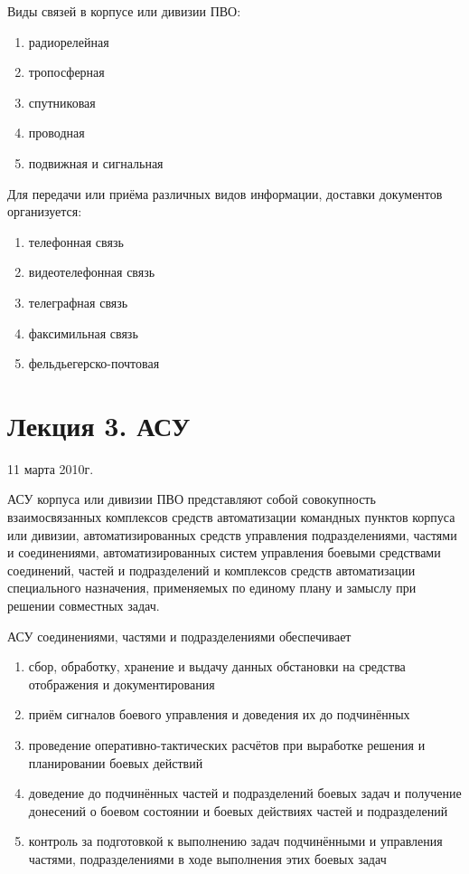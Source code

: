 \documentclass[a4paper,12pt]{article}
\begin{document}
	Виды связей в корпусе или дивизии ПВО:
	\begin{enumerate}
		\item радиорелейная
		\item тропосферная
		\item спутниковая
		\item проводная
		\item подвижная и сигнальная
	\end{enumerate}
	Для передачи или приёма различных видов информации, доставки документов организуется:
	\begin{enumerate}
		\item телефонная связь
		\item видеотелефонная связь
		\item телеграфная связь
		\item факсимильная связь
		\item фельдьегерско-почтовая
	\end{enumerate}
	\section{\bf Лекция 3. АСУ}
	\centerline{11 марта 2010г.}
	АСУ корпуса или дивизии ПВО представляют собой совокупность взаимосвязанных комплексов
средств автоматизации командных пунктов корпуса или дивизии, автоматизированных средств
управления подразделениями, частями и соединениями, автоматизированных систем управления
боевыми средствами соединений, частей и подразделений и комплексов средств автоматизации
специального назначения, применяемых по единому плану и замыслу при решении совместных задач.

	АСУ соединениями, частями и подразделениями обеспечивает 
	\begin{enumerate}
		\item сбор, обработку, хранение и выдачу данных обстановки на средства отображения и 
		документирования
		\item приём сигналов боевого управления и доведения их до подчинённых
		\item проведение оперативно-тактических расчётов при выработке решения и планировании 
		боевых действий
		\item доведение до подчинённых частей и подразделений боевых задач и получение 
		донесений о боевом состоянии и боевых действиях частей и подразделений
		\item контроль за подготовкой к выполнению задач подчинёнными и управления частями, 
		подразделениями в ходе выполнения этих боевых задач
	\end{enumerate}
	
\end{document}
